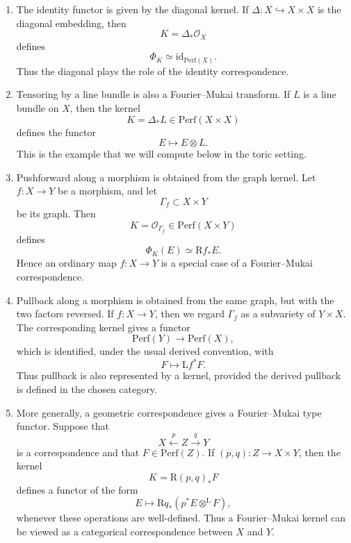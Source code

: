 \begin{enumerate}
    \item The identity functor is given by the diagonal kernel. If
    \(\Delta:X\hookrightarrow X\times X\) is the diagonal embedding, then
    \[
    K=\Delta_*\mathcal O_X
    \]
    defines
    \[
    \Phi_K\simeq \mathrm{id}_{\mathrm{Perf}(X)}.
    \]
    Thus the diagonal plays the role of the identity correspondence.

    \item Tensoring by a line bundle is also a Fourier--Mukai transform. If
    \(L\) is a line bundle on \(X\), then the kernel
    \[
    K=\Delta_*L\in \mathrm{Perf}(X\times X)
    \]
    defines the functor
    \[
    E\longmapsto E\otimes L.
    \]
    This is the example that we will compute below in the toric setting.

    \item Pushforward along a morphism is obtained from the graph kernel. Let
    \(f:X\to Y\) be a morphism, and let
    \[
    \Gamma_f\subset X\times Y
    \]
    be its graph. Then
    \[
    K=\mathcal O_{\Gamma_f}\in \mathrm{Perf}(X\times Y)
    \]
    defines
    \[
    \Phi_K(E)\simeq \mathrm{R}f_*E.
    \]
    Hence an ordinary map \(f:X\to Y\) is a special case of a
    Fourier--Mukai correspondence.

    \item Pullback along a morphism is obtained from the same graph, but with
    the two factors reversed. If \(f:X\to Y\), then we regard
    \(\Gamma_f\) as a subvariety of \(Y\times X\). The corresponding kernel
    gives a functor
    \[
    \mathrm{Perf}(Y)\longrightarrow \mathrm{Perf}(X),
    \]
    which is identified, under the usual derived convention, with
    \[
    F\longmapsto \mathrm{L}f^*F.
    \]
    Thus pullback is also represented by a kernel, provided the derived
    pullback is defined in the chosen category.

    \item More generally, a geometric correspondence gives a Fourier--Mukai
    type functor. Suppose that
    \[
    X \xleftarrow{p} Z \xrightarrow{q} Y
    \]
    is a correspondence and that \(F\in \mathrm{Perf}(Z)\). If
    \((p,q):Z\to X\times Y\), then the kernel
    \[
    K=\mathrm{R}(p,q)_*F
    \]
    defines a functor of the form
    \[
    E\longmapsto \mathrm{R}q_*(p^*E\otimes^{\mathrm L}F),
    \]
    whenever these operations are well-defined. Thus a Fourier--Mukai kernel
    can be viewed as a categorical correspondence between \(X\) and \(Y\).
\end{enumerate}

